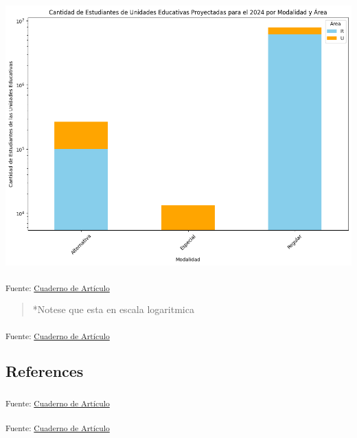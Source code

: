 \documentclass[
  12pt]{article}
\begin{document}
\includegraphics{index_files/figure-pdf/cell-35-output-1.png}

\textsubscript{Fuente: \href{sociest.org/index.ipynb.html}{Cuaderno de
Artículo}}

\begin{quote}
*Notese que esta en escala logaritmica
\end{quote}

\textsubscript{Fuente: \href{sociest.org/index.ipynb.html}{Cuaderno de
Artículo}}

\subsection{References}\label{references}

\textsubscript{Fuente: \href{sociest.org/index.ipynb.html}{Cuaderno de
Artículo}}

\textsubscript{Fuente: \href{sociest.org/index.ipynb.html}{Cuaderno de
Artículo}}


  
\end{document}
